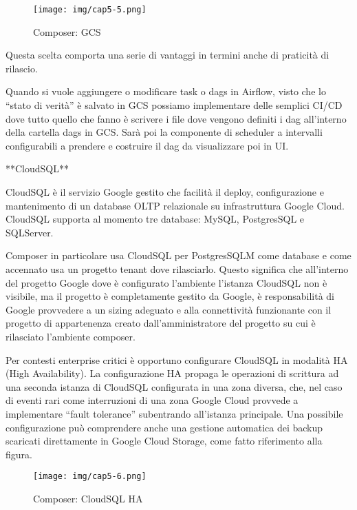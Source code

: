 \documentclass[a4paper,12pt]{report}
\begin{document}
\begin{figure}[h]
    \centering
    \texttt{[image: img/cap5-5.png]}
    \caption{Composer: GCS}
\end{figure}



Questa scelta comporta una serie di vantaggi in termini anche di praticità di rilascio.

Quando si vuole aggiungere o modificare task o dags in Airflow, visto che lo “stato di verità” è salvato in GCS possiamo implementare delle semplici CI/CD dove tutto quello che fanno è scrivere i file dove vengono definiti i dag all’interno della cartella dags in GCS. Sarà poi la componente di scheduler a intervalli configurabili a prendere e costruire il dag da visualizzare poi in UI.


**CloudSQL**

CloudSQL è il servizio Google gestito che facilità il deploy, configurazione e mantenimento di un database OLTP relazionale su infrastruttura Google Cloud. CloudSQL supporta al momento tre database: MySQL, PostgresSQL e SQLServer.

Composer in particolare usa CloudSQL per PostgresSQLM come database e come accennato usa un progetto tenant dove rilasciarlo. Questo significa che all’interno del progetto Google dove è configurato l’ambiente l’istanza CloudSQL non è visibile, ma il progetto è completamente gestito da Google, è responsabilità di Google provvedere a un sizing adeguato e alla connettività funzionante con il progetto di appartenenza creato dall’amministratore del progetto su cui è rilasciato l’ambiente composer.

Per contesti enterprise critici è opportuno configurare CloudSQL in modalità HA (High Availability). La configurazione HA propaga le operazioni di scrittura ad una seconda istanza di CloudSQL configurata in una zona diversa, che, nel caso di eventi rari come interruzioni di una zona Google Cloud provvede a implementare “fault tolerance” subentrando all’istanza principale. Una possibile configurazione può comprendere anche una gestione automatica dei backup scaricati direttamente in Google Cloud Storage, come fatto riferimento alla figura.

\begin{figure}[h]
    \centering
    \texttt{[image: img/cap5-6.png]}
    \caption{Composer: CloudSQL HA}
\end{figure}
\end{document}
